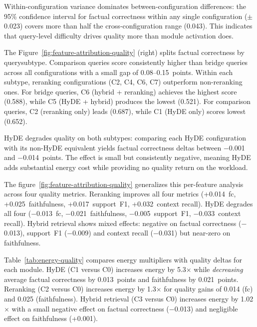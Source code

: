 Within-configuration variance dominates between-configuration differences:
the 95\% confidence interval for factual correctness within any single
configuration ($\pm$0.023) covers more than half the cross-configuration
range (0.043). This indicates that query-level difficulty drives quality more
than module activation does.


The Figure~\ref{fig:feature-attribution-quality} (right) splits
factual correctness by querysubtype. Comparison queries score consistently higher than bridge queries
across all configurations with a small gap of 0.08--0.15~points. Within each
subtype, reranking configurations (C2, C4, C6, C7) outperform non-reranking
ones. For bridge queries, C6 (hybrid + reranking) achieves the highest score
(0.588), while C5 (HyDE + hybrid) produces the lowest (0.521). For comparison
queries, C2 (reranking only) leads (0.687), while C1 (HyDE only) scores lowest
(0.652).

HyDE degrades quality on both subtypes: comparing each HyDE configuration with
its non-HyDE equivalent yields
factual correctness deltas between $-$0.001 and $-$0.014~points. The effect is
small but consistently negative, meaning HyDE adds substantial energy cost
while providing no quality return on the workload.

The figure~\ref{fig:feature-attribution-quality} generalizes this per-feature
analysis across four quality metrics. Reranking improves all four metrics
(+0.014~fc, +0.025~faithfulness, +0.017~support~F1, +0.032~context recall).
HyDE degrades all four ($-$0.013~fc, $-$0.021~faithfulness,
$-$0.005~support~F1, $-$0.033~context recall). Hybrid retrieval
shows mixed effects: negative on factual correctness ($-$0.013), support~F1 ($-$0.009)
and context recall ($-$0.031) but near-zero on faithfulness.


Table~\ref{tab:energy-quality} compares energy multipliers with quality deltas
for each module. HyDE (C1 versus C0) increases energy by 5.3$\times$ while
\emph{decreasing} average factual correctness by 0.013~points and faithfulness
by 0.021~points. Reranking (C2 versus C0) increases energy by 1.3$\times$ for
quality gains of 0.014 (fc) and 0.025 (faithfulness). Hybrid retrieval (C3
versus C0) increases energy by 1.02$\times$ with a small negative effect on
factual correctness ($-$0.013) and negligible effect on faithfulness (+0.001).

